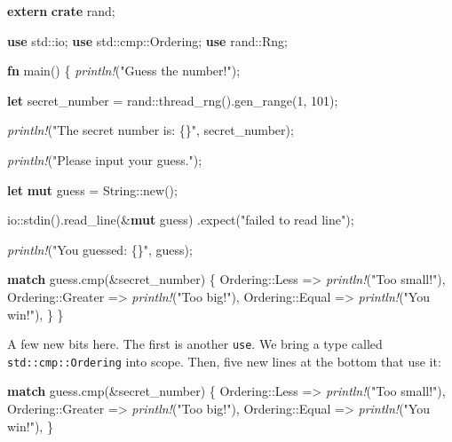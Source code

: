 \documentclass[a4paper,]{book}
\newenvironment{Shaded}{\begin{snugshade}}{\end{snugshade}}
\newcommand{\KeywordTok}[1]{\textcolor[rgb]{0.13,0.29,0.53}{\textbf{{#1}}}}
\newcommand{\DataTypeTok}[1]{\textcolor[rgb]{0.13,0.29,0.53}{{#1}}}
\newcommand{\DecValTok}[1]{\textcolor[rgb]{0.00,0.00,0.81}{{#1}}}
\newcommand{\StringTok}[1]{\textcolor[rgb]{0.31,0.60,0.02}{{#1}}}
\newcommand{\PreprocessorTok}[1]{\textcolor[rgb]{0.56,0.35,0.01}{\textit{{#1}}}}
\newcommand{\NormalTok}[1]{{#1}}
\begin{document}
\begin{Shaded}
\begin{Highlighting}[]
\KeywordTok{extern} \KeywordTok{crate} \NormalTok{rand;}

\KeywordTok{use} \NormalTok{std::io;}
\KeywordTok{use} \NormalTok{std::cmp::Ordering;}
\KeywordTok{use} \NormalTok{rand::Rng;}

\KeywordTok{fn} \NormalTok{main() \{}
    \PreprocessorTok{println!}\NormalTok{(}\StringTok{"Guess the number!"}\NormalTok{);}

    \KeywordTok{let} \NormalTok{secret_number = rand::thread_rng().gen_range(}\DecValTok{1}\NormalTok{, }\DecValTok{101}\NormalTok{);}

    \PreprocessorTok{println!}\NormalTok{(}\StringTok{"The secret number is: \{\}"}\NormalTok{, secret_number);}

    \PreprocessorTok{println!}\NormalTok{(}\StringTok{"Please input your guess."}\NormalTok{);}

    \KeywordTok{let} \KeywordTok{mut} \NormalTok{guess = }\DataTypeTok{String}\NormalTok{::new();}

    \NormalTok{io::stdin().read_line(&}\KeywordTok{mut} \NormalTok{guess)}
        \NormalTok{.expect(}\StringTok{"failed to read line"}\NormalTok{);}

    \PreprocessorTok{println!}\NormalTok{(}\StringTok{"You guessed: \{\}"}\NormalTok{, guess);}

    \KeywordTok{match} \NormalTok{guess.cmp(&secret_number) \{}
        \NormalTok{Ordering::Less    => }\PreprocessorTok{println!}\NormalTok{(}\StringTok{"Too small!"}\NormalTok{),}
        \NormalTok{Ordering::Greater => }\PreprocessorTok{println!}\NormalTok{(}\StringTok{"Too big!"}\NormalTok{),}
        \NormalTok{Ordering::Equal   => }\PreprocessorTok{println!}\NormalTok{(}\StringTok{"You win!"}\NormalTok{),}
    \NormalTok{\}}
\NormalTok{\}}
\end{Highlighting}
\end{Shaded}

A few new bits here. The first is another \texttt{use}. We bring a type
called \texttt{std::cmp::Ordering} into scope. Then, five new lines at
the bottom that use it:

\begin{Shaded}
\begin{Highlighting}[]
\KeywordTok{match} \NormalTok{guess.cmp(&secret_number) \{}
    \NormalTok{Ordering::Less    => }\PreprocessorTok{println!}\NormalTok{(}\StringTok{"Too small!"}\NormalTok{),}
    \NormalTok{Ordering::Greater => }\PreprocessorTok{println!}\NormalTok{(}\StringTok{"Too big!"}\NormalTok{),}
    \NormalTok{Ordering::Equal   => }\PreprocessorTok{println!}\NormalTok{(}\StringTok{"You win!"}\NormalTok{),}
\NormalTok{\}}
\end{Highlighting}
\end{Shaded}
\end{document}
